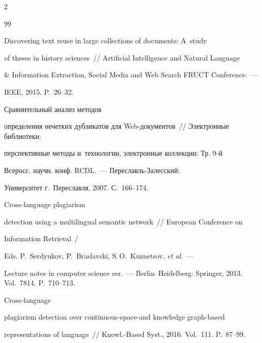 \begin{multicols}{2}
{{\begin{thebibliography}{99}


 Discovering text reuse in large collections of documents: A~study 


of theses in history sciences~//  Artificial Intelligence and Natural Language 


\& Information Extraction, Social Media and Web Search FRUCT Conference.~--- 


IEEE, 2015. P.~26--32.










 Сравнительный анализ методов 


определения нечетких дубликатов для Web-до\-ку\-мен\-тов~// Электронные библиотеки: 


перспективные методы и~технологии, электронные коллекции: Тр. 9-й 


Всеросс. научн. конф. RCDL.~--- Пе\-ре\-славль-За\-лес\-ский: 


Университет г.~Переславля, 2007. С.~166--174.













 Cross-language plagiarism 


detection using a multilingual semantic network~//  European Conference on 


Information Retrieval~/


Eds. P.~Serdyukov, P.~Braslavski, S.\,O.~Kuznetsov, \textit{et al}.~---


Lecture notes in computer science ser.~--- Berlin--Heidelberg: Springer,  2013. Vol.~7814. P.~710--713.







 Cross-language 


plagiarism detection over continuous-space-and knowledge graph-based 


representations of language~// Knowl.-Based Syst., 2016. Vol.~111. P.~87--99.









\end{thebibliography}}}
\end{multicols}
